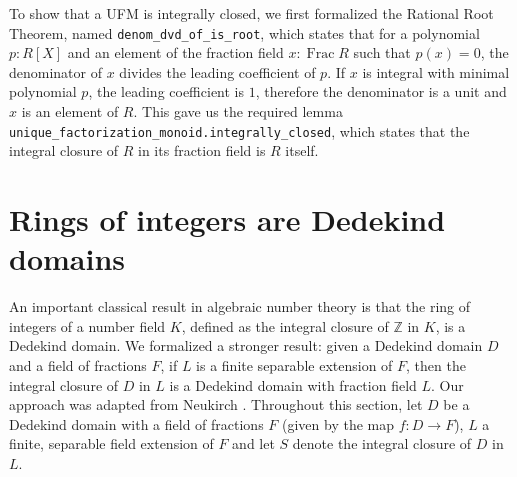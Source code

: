\documentclass[a4paper,USenglish,cleveref, autoref, thm-restate]{lipics-v2021}
\newcommand{\lean}[1]{\texttt{#1}\xspace} %
\newcommand{\Z}{\mathbb{Z}}
\DeclareMathOperator{\Frac}{Frac}
\begin{document}
To show that a UFM is integrally closed, we first formalized the Rational Root Theorem, named \lean{denom\_dvd\_of\_is\_root},
which states that for a polynomial $p : R[X]$ and an element of the fraction field $x : \Frac R$ such that $p(x) = 0$, the denominator of $x$ divides the leading coefficient of $p$.
If $x$ is integral with minimal polynomial $p$, the leading coefficient is $1$, therefore the denominator is a unit and $x$ is an element of $R$.
This gave us the required lemma \lean{unique\_factorization\_monoid.integrally\_closed}, which states that the integral closure of $R$ in its fraction field is $R$ itself.

\section{Rings of integers are Dedekind domains} \label{sec:integral-closure}


An important classical result in algebraic number theory is that the ring of integers of a number field $K$, defined as the integral closure of $\Z$ in $K$, is a Dedekind domain. We formalized a stronger result: given a Dedekind domain $D$ and a field of fractions $F$, if $L$ is a finite separable extension of $F$, then the integral closure of $D$ in $L$ is a Dedekind domain with fraction field $L$.
Our approach was adapted from Neukirch \cite[Theorem~3.1]{Neukirch}.
Throughout this section, let $D$ be a Dedekind domain with a field of fractions $F$ (given by the map $f \colon D \to F$), $L$ a finite, separable field extension of $F$ and let $S$ denote the integral closure of $D$ in $L$.
\end{document}
